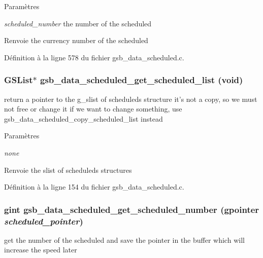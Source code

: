 \begin{DoxyParams}{Paramètres}
\item[{\em scheduled\_\-number}]the number of the scheduled\end{DoxyParams}
\begin{DoxyReturn}{Renvoie}
the currency number of the scheduled 
\end{DoxyReturn}


Définition à la ligne 578 du fichier gsb\_\-data\_\-scheduled.c.

\subsubsection[{gsb\_\-data\_\-scheduled\_\-get\_\-scheduled\_\-list}]{\setlength{\rightskip}{0pt plus 5cm}GSList$\ast$ gsb\_\-data\_\-scheduled\_\-get\_\-scheduled\_\-list (void)}\label{gsb__data__scheduled_8c_a9e321b67331018d8f0a42022643a10d2}
return a pointer to the g\_\-slist of scheduleds structure it's not a copy, so we must not free or change it if we want to change something, use gsb\_\-data\_\-scheduled\_\-copy\_\-scheduled\_\-list instead


\begin{DoxyParams}{Paramètres}
\item[{\em none}]\end{DoxyParams}
\begin{DoxyReturn}{Renvoie}
the slist of scheduleds structures 
\end{DoxyReturn}


Définition à la ligne 154 du fichier gsb\_\-data\_\-scheduled.c.

\subsubsection[{gsb\_\-data\_\-scheduled\_\-get\_\-scheduled\_\-number}]{\setlength{\rightskip}{0pt plus 5cm}gint gsb\_\-data\_\-scheduled\_\-get\_\-scheduled\_\-number (gpointer {\em scheduled\_\-pointer})}\label{gsb__data__scheduled_8c_ab2a72c93ed6dcf08a477aea4e069c5e3}
get the number of the scheduled and save the pointer in the buffer which will increase the speed later


